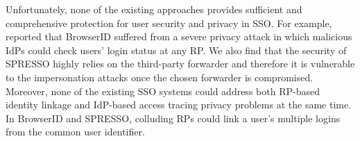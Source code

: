 
Unfortunately, none of the existing approaches provides sufficient and comprehensive protection for user security and privacy in SSO. For example, \cite{BrowserID} reported that BrowserID suffered from a severe privacy attack in which malicious IdPs could check users' login status at any RP. We also find that the security of SPRESSO highly relies on the third-party forwarder and therefore it is vulnerable to the impersonation attacks once the chosen forwarder is compromised. 
Moreover, none of the existing SSO systems could address both RP-based identity linkage and IdP-based access tracing privacy problems at the same time. In BrowserID and SPRESSO, colluding RPs could link a user's multiple logins from the common user identifier.


